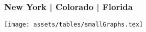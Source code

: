 \begin{frame}
    \frametitle{New York | Colorado | Florida}

    

    \texttt{[image: assets/tables/smallGraphs.tex]}

\end{frame}